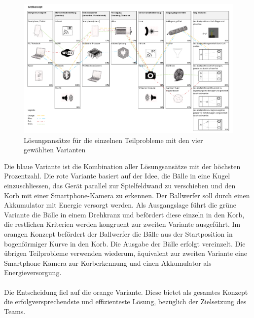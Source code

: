 \newpage
\begin{landscape}
	\begin{figure}[t]
		\centering
		\includegraphics[scale=0.8,clip,trim= 2mm 2mm 2mm 8mm]
		{Enddokumentation/Varianten/Bilder/Grobkonzept.png}
		\caption{Lösungsansätze für die einzelnen Teilprobleme mit den vier gewählten Varianten}
		\label{fig:Grobkonzept}
	\end{figure}
\end{landscape}
\noindent Die blaue Variante ist die Kombination aller Lösungsansätze mit der höchsten
Prozentzahl. Die rote Variante basiert auf der Idee, die Bälle in eine Kugel einzuschliessen,
das Gerät parallel zur Spielfeldwand zu verschieben und den Korb mit einer Smartphone-Kamera zu
erkennen. Der Ballwerfer soll durch einen Akkumulator mit Energie versorgt werden. Als
Ausgangslage führt die grüne Variante die Bälle in einem Drehkranz und befördert diese einzeln
in den Korb, die restlichen Kriterien werden kongruent zur zweiten Variante ausgeführt. Im
orangen Konzept befördert der Ballwerfer die Bälle aus der Startposition in bogenförmiger Kurve in den Korb. Die Ausgabe der Bälle erfolgt vereinzelt. Die übrigen Teilprobleme verwenden
wiederum, äquivalent zur zweiten Variante eine Smartphone-Kamera zur Korberkennung und einen
Akkumulator als Energieversorgung.\\
\\
Die Entscheidung fiel auf die orange Variante. Diese bietet als gesamtes Konzept die
erfolgversprechendste und effizienteste Lösung, bezüglich der Zielsetzung des Teams. \\

